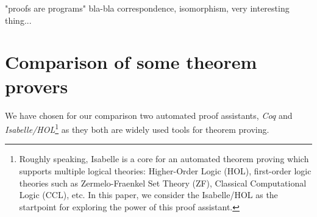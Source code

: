 \documentclass[article]{aaltoseries}
\begin{document}
"proofs are programs"
bla-bla correspondence, isomorphism, very interesting thing...




		




\section{Comparison of some theorem provers}
\label{sec:comparison}

We have chosen for our comparison two automated proof assistants, \textit{Coq} and \textit{Isabelle/HOL}\footnote{Roughly speaking, Isabelle is a core for an automated theorem proving which supports multiple logical theories: Higher-Order Logic (HOL), first-order logic theories such as Zermelo-Fraenkel Set Theory (ZF), Classical Computational Logic (CCL), etc. In this paper, we consider the Isabelle/HOL as the startpoint for exploring the power of this proof assistant.} as they both are widely used tools for theorem proving.
\end{document}
